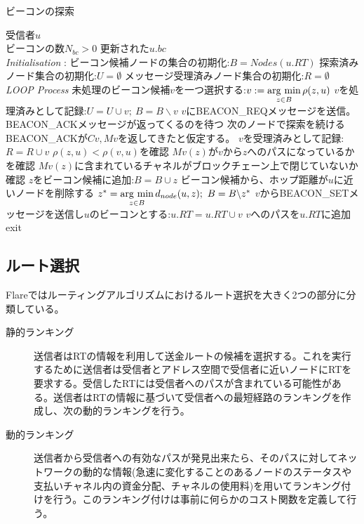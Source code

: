 \documentclass[12pt]{jarticle}
\newcommand{\argmin}{\mathop{\rm arg~min}\limits}
\begin{document}
\begin{algorithm}
 \caption{ビーコンの探索}
 \begin{algorithmic}[1]
 \renewcommand{\algorithmicrequire}{\textbf{Input:}}
 \renewcommand{\algorithmicensure}{\textbf{Output:}}
 \REQUIRE 受信者$u$ \\
 ビーコンの数$N_{bc} > 0$
 \ENSURE  更新された$u.bc$
 \\ \textit{Initialisation} :
  \STATE ビーコン候補ノードの集合の初期化:$B = Nodes(u.RT)$
  \STATE 探索済みノード集合の初期化:$U = \emptyset$
  \STATE メッセージ受理済みノード集合の初期化:$R = \emptyset$
 \\ \textit{LOOP Process}
  \STATE 未処理のビーコン候補$v$を一つ選択する:$v := \argmin_{z\in B} \rho(z,u)$
  \STATE $v$を処理済みとして記録:$U = U \cup {v}; \ B = B \backslash {v}$
  \STATE $v$にBEACON\_REQメッセージを送信。BEACON\_ACKメッセージが返ってくるのを待つ
  \STATE 次のノードで探索を続ける
  \ENDIF
  \STATE BEACON\_ACKが$Cv,Mv$を返してきたと仮定する。
  \STATE $v$を受理済みとして記録:$R = R\cup {v}$
  \STATE $\rho(z,u) < \rho(v,u)$を確認
  \STATE $Mv(z)$が$v$から$z$へのパスになっているかを確認
  \STATE $Mv(z)$に含まれているチャネルがブロックチェーン上で閉じていないか確認
  \STATE $z$をビーコン候補に追加:$B = B\cup {z}$
  \ENDFOR
  \STATE ビーコン候補から、ホップ距離が$u$に近いノードを削除する
  \STATE $z^* = \argmin_{z \in B} d_{node}(u,z); \ B = B \backslash {z^*}$
  \ENDWHILE 
  \ENDWHILE
  \STATE $v$からBEACON\_SETメッセージを送信し$u$のビーコンとする:$u.RT = u.RT \cup {v}$
  \STATE $v$へのパスを$u.RT$に追加
  \STATE exit 
  \ENDIF
  \ENDFOR
 \end{algorithmic} 
 \end{algorithm}

\subsection{ルート選択}
Flareではルーティングアルゴリズムにおけるルート選択を大きく2つの部分に分類している。
\begin{description}
\item[静的ランキング] 送信者はRTの情報を利用して送金ルートの候補を選択する。これを実行するために送信者は受信者とアドレス空間で受信者に近いノードにRTを要求する。受信したRTには受信者へのパスが含まれている可能性がある。送信者はRTの情報に基づいて受信者への最短経路のランキングを作成し、次の動的ランキングを行う。
\item[動的ランキング] 送信者から受信者への有効なパスが発見出来たら、そのパスに対してネットワークの動的な情報(急速に変化することのあるノードのステータスや支払いチャネル内の資金分配、チャネルの使用料)を用いてランキング付けを行う。このランキング付けは事前に何らかのコスト関数を定義して行う。
\end{description}
\end{document}
